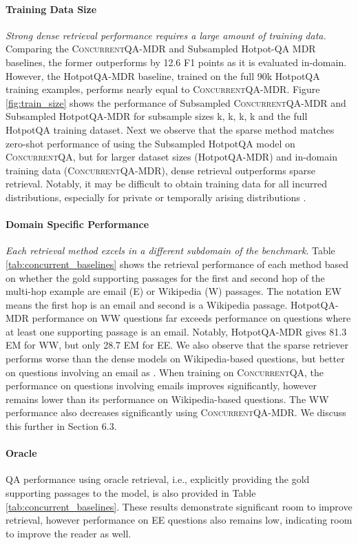 \documentclass{article}
\renewcommand\cite{\citep}	\newcommand\shortcite{\citeyearpar}\newcommand\newcite{\citet}
\newcommand{\datasetname}{\textsc{ConcurrentQA}\xspace}
\begin{document}
\paragraph{Training Data Size} \textit{Strong dense retrieval performance requires a large amount of training data.} 
Comparing the \datasetname-MDR and Subsampled Hotpot-QA MDR baselines, the former outperforms by 12.6 F1 points as it is evaluated in-domain. However, the HotpotQA-MDR baseline, trained on the full 90k HotpotQA training examples, performs nearly equal to \datasetname-MDR. 
Figure \ref{fig:train_size} shows the performance of Subsampled \datasetname-MDR and Subsampled HotpotQA-MDR for subsample sizes k, k, k, k and the full HotpotQA training dataset. 
Next we observe that the sparse method matches zero-shot performance of using the Subsampled HotpotQA model on \datasetname, but for larger dataset sizes (HotpotQA-MDR) and in-domain training data (\datasetname-MDR), dense retrieval outperforms sparse retrieval.
Notably, it may be difficult to obtain training data for all incurred distributions, especially for private or temporally arising distributions \cite{hawking2004enterprisesearch, chitrita2005personalmetadata}. 

\paragraph{Domain Specific Performance} \textit{Each retrieval method excels in a different subdomain of the benchmark}.  Table \ref{tab:concurrent_baselines} shows the retrieval performance of each method based on whether the gold supporting passages for the first and second hop of the multi-hop example are email (E) or Wikipedia (W) passages. The notation EW means the first hop is an email and second is a Wikipedia passage. HotpotQA-MDR performance on WW questions far exceeds performance on questions where at least one supporting passage is an email. Notably, HotpotQA-MDR gives 81.3 EM for WW, but only 28.7 EM for EE. We also observe that the sparse retriever performs worse than the dense models on Wikipedia-based questions, but better on questions involving an email as .
When training on \datasetname, the performance on questions involving emails improves significantly, however remains lower than its performance on Wikipedia-based questions. The WW performance also decreases significantly using \datasetname-MDR. 
We discuss this further in Section 6.3.

\paragraph{Oracle} QA performance using oracle retrieval, i.e., explicitly providing the gold supporting passages to the model, is also provided in Table \ref{tab:concurrent_baselines}. These results demonstrate significant room to improve retrieval, however performance on EE questions also remains low, indicating room to improve the reader as well. 
\end{document}
